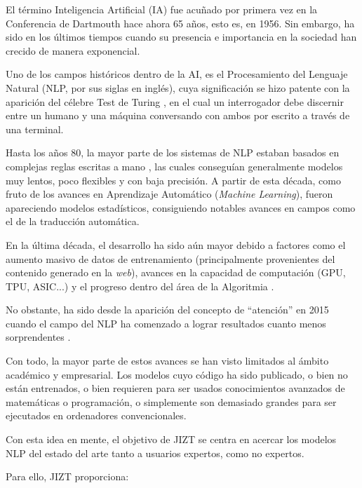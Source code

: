   \label{chapter:intro}

\vspace{-0.07cm}

El término Inteligencia Artificial (IA) fue acuñado por primera vez en la Conferencia de Dartmouth \cite{crevier95} hace ahora 65 años, esto es, en 1956. Sin embargo, ha sido en los últimos tiempos cuando su presencia e importancia en la sociedad han crecido de manera exponencial.

Uno de los campos históricos dentro de la AI, es el Procesamiento del Lenguaje Natural (NLP, por sus siglas en inglés), cuya significación se hizo patente con la aparición del célebre Test de Turing \cite{turing50}, en el cual un interrogador debe discernir entre un humano y una máquina conversando con ambos por escrito a través de una terminal.

Hasta los años 80, la mayor parte de los sistemas de NLP estaban basados en complejas reglas escritas a mano \cite{mccorduck79}, las cuales conseguían generalmente modelos muy lentos, poco flexibles y con baja precisión. A partir de esta década, como fruto de los avances en Aprendizaje Automático (\emph{Machine Learning}), fueron apareciendo modelos estadísticos, consiguiendo notables avances en campos como el de la traducción automática.

En la última década, el desarrollo ha sido aún mayor debido a factores como el aumento masivo de datos de entrenamiento (principalmente provenientes del contenido generado en la \emph{web}), avances en la capacidad de computación (GPU, TPU, ASIC...) y el progreso dentro del área de la Algoritmia \cite{rahmfeld19}.

No obstante, ha sido desde la aparición del concepto de ``atención'' en 2015 \cite{luong15, bahdanau16, vaswani17} cuando el campo del NLP ha comenzado a lograr resultados cuanto menos sorprendentes \cite{macaulay20, wiggers21}.

Con todo, la mayor parte de estos avances se han visto limitados al ámbito académico y empresarial. Los modelos cuyo código ha sido publicado, o bien no están entrenados, o bien requieren para ser usados conocimientos avanzados de matemáticas o programación, o simplemente son demasiado grandes para ser ejecutados en ordenadores convencionales.

Con esta idea en mente, el objetivo de JIZT se centra en acercar los modelos NLP del estado del arte tanto a usuarios expertos, como no expertos.

Para ello, JIZT proporciona:

